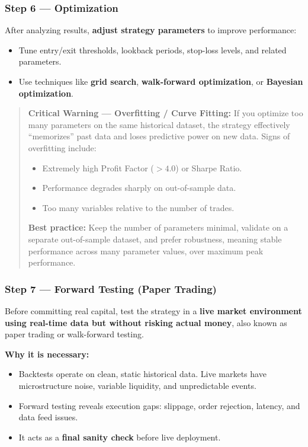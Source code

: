 \documentclass[12pt,openany]{book}
\begin{document}
\subsubsection{Step 6 --- Optimization}

After analyzing results, \textbf{adjust strategy parameters} to improve performance:
\begin{itemize}[leftmargin=*]
    \item Tune entry/exit thresholds, lookback periods, stop-loss levels, and related parameters.
    \item Use techniques like \textbf{grid search}, \textbf{walk-forward optimization}, or \textbf{Bayesian optimization}.
\end{itemize}

\begin{quote}
    \textbf{Critical Warning --- Overfitting / Curve Fitting:} If you optimize too many parameters on the same historical dataset, the strategy effectively ``memorizes'' past data and loses predictive power on new data. Signs of overfitting include:
    \begin{itemize}[leftmargin=*]
        \item Extremely high Profit Factor ($> 4.0$) or Sharpe Ratio.
        \item Performance degrades sharply on out-of-sample data.
        \item Too many variables relative to the number of trades.
    \end{itemize}
    \textbf{Best practice:} Keep the number of parameters minimal, validate on a separate out-of-sample dataset, and prefer robustness, meaning stable performance across many parameter values, over maximum peak performance.
\end{quote}

\subsubsection{Step 7 --- Forward Testing (Paper Trading)}

Before committing real capital, test the strategy in a \textbf{live market environment using real-time data but without risking actual money}, also known as paper trading or walk-forward testing.

\textbf{Why it is necessary:}
\begin{itemize}[leftmargin=*]
    \item Backtests operate on clean, static historical data. Live markets have microstructure noise, variable liquidity, and unpredictable events.
    \item Forward testing reveals execution gaps: slippage, order rejection, latency, and data feed issues.
    \item It acts as a \textbf{final sanity check} before live deployment.
\end{itemize}
\end{document}
